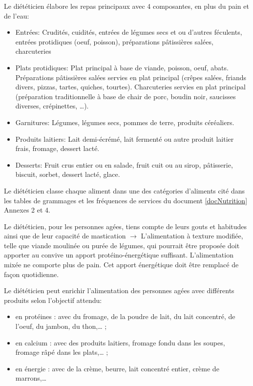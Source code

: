 Le diététicien élabore les repas principaux avec 4 composantes, en plus du pain et de l'eau:
\begin{itemize}
 \item Entrées: Crudités, cuidités, entrées de légumes secs et ou d’autres féculents, entrées protidiques (oeuf, poisson), préparations pâtissières salées, charcuteries
 \item Plats protidiques: Plat principal à base de viande, poisson, oeuf, abats. Préparations pâtissières salées servies en plat principal (crêpes salées, friands divers, pizzas, tartes, quiches, tourtes). Charcuteries servies en plat principal (préparation traditionnelle à base de chair de porc, boudin noir, saucisses diverses, crépinettes, …).
 \item Garnitures: Légumes, légumes secs, pommes de terre, produits céréaliers.
 \item Produits laitiers: Lait demi-écrémé, lait fermenté ou autre produit laitier frais, fromage, dessert lacté.
 \item Desserts: Fruit crus entier ou en salade, fruit cuit ou au sirop, pâtisserie, biscuit, sorbet, dessert lacté, glace.
\end{itemize}

Le diététicien classe chaque aliment dans une des catégories d'aliments cité dans les tables de grammages et les fréquences de services du document \ref{docNutrition} Annexes 2 et 4.

Le diététicien, pour les personnes agées, tiens compte de leurs gouts et habitudes ainsi que de leur capacité de mastication $\rightarrow$ L’alimentation à texture modifiée, telle que viande moulinée ou purée de légumes, qui pourrait être proposée doit apporter au convive un apport protéino-énergétique suffisant. L’alimentation mixée ne comporte plus de pain. Cet apport énergétique doit être remplacé de façon quotidienne.

Le diététicien peut enrichir l'alimentation des personnes agées avec différents produits selon l'objectif attendu:
\begin{itemize}
 \item en protéines : avec du fromage, de la poudre de lait, du lait concentré, de l’oeuf, du jambon, du thon,… ;
 \item en calcium : avec des produits laitiers, fromage fondu dans les soupes, fromage râpé dans les plats,… ;
 \item en énergie : avec de la crème, beurre, lait concentré entier, crème de marrons,…
\end{itemize}

